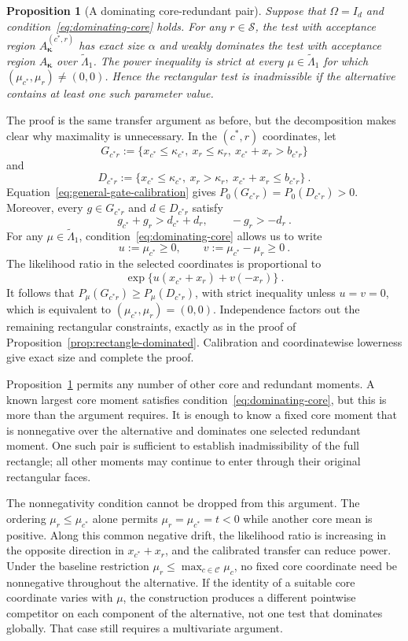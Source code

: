 \documentclass[12pt]{article}
\newtheorem{proposition}{Proposition}
\theoremstyle{remark}
\begin{document}
\begin{proposition}[A dominating core-redundant pair]
\label{prop:dominating-pair}
Suppose that $\Omega=I_d$ and condition~\eqref{eq:dominating-core} holds.
For any $r\in\mathcal S$, the test with acceptance region
$A_{\bm\kappa}^{(c^*,r)}$ has exact size $\alpha$ and weakly dominates the
test with acceptance region $A_{\bm\kappa}$ over
$\widetilde\Lambda_1$.  The power inequality is strict at every
$\mu\in\widetilde\Lambda_1$ for which
$(\mu_{c^*},\mu_r)\ne(0,0)$.  Hence the rectangular test is inadmissible if
the alternative contains at least one such parameter value.
\end{proposition}

The proof is the same transfer argument as before, but the decomposition makes
clear why maximality is unnecessary.  In the $(c^*,r)$ coordinates, let
\[
G_{c^*r}
:=
\{x_{c^*}\le\kappa_{c^*},\ x_r\le\kappa_r,\
  x_{c^*}+x_r>b_{c^*r}\}
\]
and
\[
D_{c^*r}
:=
\{x_{c^*}\le\kappa_{c^*},\ x_r>\kappa_r,\
  x_{c^*}+x_r\le b_{c^*r}\}~.
\]
Equation~\eqref{eq:general-gate-calibration} gives
$P_0(G_{c^*r})=P_0(D_{c^*r})>0$.  Moreover, every
$g\in G_{c^*r}$ and $d\in D_{c^*r}$ satisfy
\[
g_{c^*}+g_r>d_{c^*}+d_r,
\qquad
-g_r>-d_r~.
\]
For any $\mu\in\widetilde\Lambda_1$,
condition~\eqref{eq:dominating-core} allows us to write
\[
u:=\mu_{c^*}\ge0,
\qquad
v:=\mu_{c^*}-\mu_r\ge0~.
\]
The likelihood ratio in the selected coordinates is proportional to
\[
\exp\{u(x_{c^*}+x_r)+v(-x_r)\}~.
\]
It follows that $P_\mu(G_{c^*r})\ge P_\mu(D_{c^*r})$, with strict inequality
unless $u=v=0$, which is equivalent to
$(\mu_{c^*},\mu_r)=(0,0)$.  Independence factors out the remaining
rectangular constraints, exactly as in the proof of
Proposition~\ref{prop:rectangle-dominated}.  Calibration and coordinatewise
lowerness give exact size and complete the proof.

Proposition~\ref{prop:dominating-pair} permits any number of other core and
redundant moments.  A known largest core moment satisfies
condition~\eqref{eq:dominating-core}, but this is more than the argument
requires.  It is enough to know a fixed core moment that is nonnegative over
the alternative and dominates one selected redundant moment.  One such pair
is sufficient to establish inadmissibility of the full rectangle; all other
moments may continue to enter through their original rectangular faces.

The nonnegativity condition cannot be dropped from this argument.  The
ordering $\mu_r\le\mu_{c^*}$ alone permits
$\mu_r=\mu_{c^*}=t<0$ while another core mean is positive.  Along this common
negative drift, the likelihood ratio is increasing in the opposite direction
in $x_{c^*}+x_r$, and the calibrated transfer can reduce power.  Under the
baseline restriction $\mu_r\le\max_{c\in\mathcal C}\mu_c$, no fixed core
coordinate need be nonnegative throughout the alternative.  If the identity
of a suitable core coordinate varies with $\mu$, the construction produces a
different pointwise competitor on each component of the alternative, not one
test that dominates globally.  That case still requires a multivariate
argument.
\end{document}
